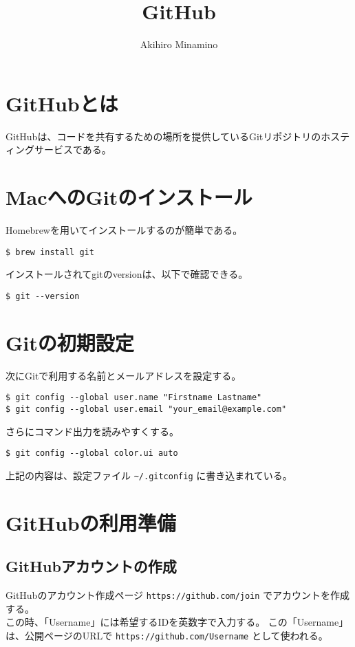 \documentclass[11pt, oneside]{article}   	%
\title{GitHub}
\author{Akihiro Minamino}
\begin{document}
\maketitle
\section{GitHubとは}
GitHubは、コードを共有するための場所を提供しているGitリポジトリのホスティングサービスである。\\

\section{MacへのGitのインストール}
Homebrewを用いてインストールするのが簡単である。
\begin{lstlisting}
$ brew install git
\end{lstlisting}
インストールされてgitのversionは、以下で確認できる。
\begin{lstlisting}
$ git --version
\end{lstlisting}

\section{Gitの初期設定}
次にGitで利用する名前とメールアドレスを設定する。
\begin{lstlisting}
$ git config --global user.name "Firstname Lastname"
$ git config --global user.email "your_email@example.com"
\end{lstlisting}
さらにコマンド出力を読みやすくする。
\begin{lstlisting}
$ git config --global color.ui auto
\end{lstlisting}
上記の内容は、設定ファイル \verb|~/.gitconfig| に書き込まれている。\\

\section{GitHubの利用準備}
\subsection{GitHubアカウントの作成}
GitHubのアカウント作成ページ \verb|https://github.com/join| でアカウントを作成する。\\
この時、「Username」には希望するIDを英数字で入力する。
この「Username」は、公開ページのURLで \verb|https://github.com/Username| として使われる。\\
\end{document}
